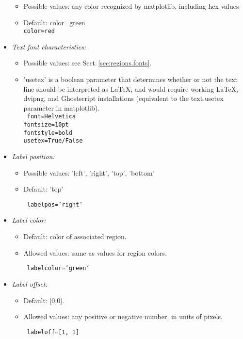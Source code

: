 \begin{itemize}
\begin{itemize}
\item Possible values: any color recognized by matplotlib, including hex values
\item Default: color=green\\

{\tt color=red}

\end{itemize}

\item {\it Text font characteristics:}

\begin{itemize}

\item Possible values: see Sect.\,\ref{sec:regions.fonts}.
   
\item 'usetex' is a boolean parameter that determines whether or not the text line should be interpreted as LaTeX, and would require working LaTeX, dvipng, and Ghostscript installations (equivalent to the text.usetex parameter in matplotlib).\\

{\tt
font=Helvetica\\ 
fontsize=10pt \\
fontstyle=bold\\
usetex=True/False\\
}

\end{itemize}



\item {\it Label position:}

\begin{itemize}
    \item Possible values: 'left', 'right', 'top', 'bottom'
    \item Default: 'top' 

{\tt
labelpos='right'
}
\end{itemize}

\item {\it Label color:}

  \begin{itemize}
    \item Default: color of associated region.
    \item Allowed values: same as values for region colors. 

{\tt 
labelcolor='green'
}
\end{itemize}


\item {\it Label offset:}

\begin{itemize}

    \item Default: [0,0].
    \item Allowed values: any positive or negative number, in units of pixels. 

{\tt
labeloff=[1, 1]
}

\end{itemize}

\end{itemize}

